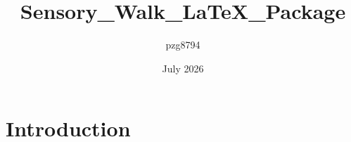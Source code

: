 \documentclass{article}
\title{Sensory_Walk_LaTeX_Package}
\author{pzg8794 }
\date{July 2026}
\begin{document}
\maketitle

\section{Introduction}
\end{document}
